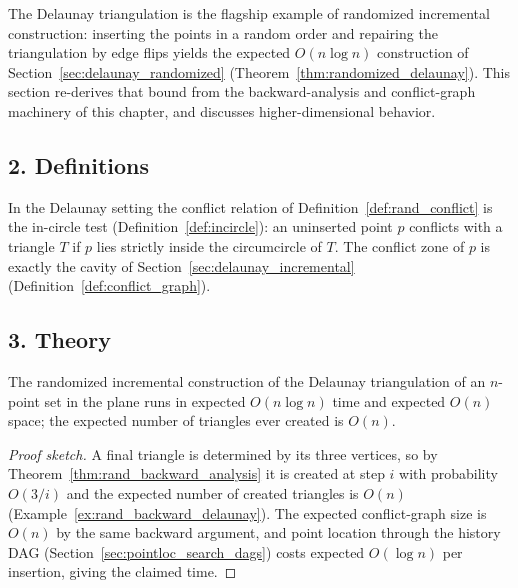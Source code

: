 The Delaunay triangulation is the flagship example of randomized incremental
construction: inserting the points in a random order and repairing the
triangulation by edge flips yields the expected $O(n \log n)$ construction of
Section~\ref{sec:delaunay_randomized} (Theorem~\ref{thm:randomized_delaunay}).
This section re-derives that bound from the backward-analysis and
conflict-graph machinery of this chapter, and discusses higher-dimensional
behavior.

\subsection{2. Definitions}

\begin{definition}\label{def:rand_delaunay_conflict}
  In the Delaunay setting the conflict relation of
  Definition~\ref{def:rand_conflict} is the in-circle test
  (Definition~\ref{def:incircle}): an uninserted point $p$ conflicts with a
  triangle $T$ if $p$ lies strictly inside the circumcircle of $T$. The
  conflict zone of $p$ is exactly the cavity of
  Section~\ref{sec:delaunay_incremental} (Definition~\ref{def:conflict_graph}).
\end{definition}

\subsection{3. Theory}

\begin{theorem}\label{thm:rand_delaunay_expected}
  The randomized incremental construction of the Delaunay triangulation of an
  $n$-point set in the plane runs in expected $O(n \log n)$ time and expected
  $O(n)$ space; the expected number of triangles ever created is $O(n)$.
\end{theorem}

\begin{proof}[Proof sketch]
  A final triangle is determined by its three vertices, so by
  Theorem~\ref{thm:rand_backward_analysis} it is created at step $i$ with
  probability $O(3/i)$ and the expected number of created triangles is $O(n)$
  (Example~\ref{ex:rand_backward_delaunay}). The expected conflict-graph size is
  $O(n)$ by the same backward argument, and point location through the history
  DAG (Section~\ref{sec:pointloc_search_dags}) costs expected $O(\log n)$ per
  insertion, giving the claimed time.
\end{proof}


